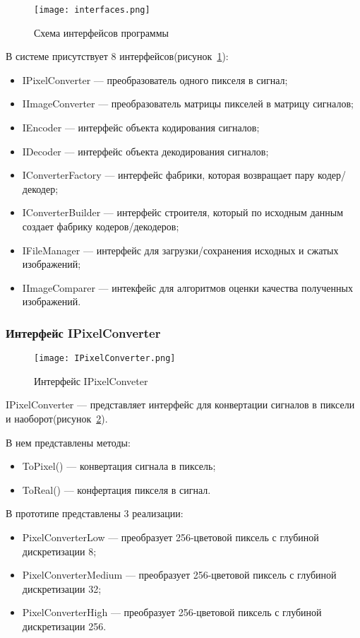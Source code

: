 \begin{figure}[ht]
\centering
  \texttt{[image: interfaces.png]}
  \caption{ Схема интерфейсов программы }
  \label{fig:interfaces}
\end{figure}
В системе присутствует 8 интерфейсов(рисунок~\ref{fig:interfaces}):
\begin{itemize}
  \item IPixelConverter --- преобразователь одного пикселя в сигнал;
  \item IImageConverter --- преобразователь матрицы пикселей в матрицу сигналов;
  \item IEncoder --- интерфейс объекта кодирования сигналов;
  \item IDecoder --- интерфейс объекта декодирования сигналов;
  \item IConverterFactory --- интерфейс фабрики, которая возвращает пару кодер/декодер;
  \item IConverterBuilder --- интерфейс строителя, который по исходным данным создает фабрику кодеров/декодеров;
  \item IFileManager --- интерфейс для загрузки/сохранения исходных и сжатых изображений;
  \item IImageComparer --- интекфейс для алгоритмов оценки качества полученных изображений.
\end{itemize}

\subsubsection{Интерфейс IPixelConverter}
\label{subsub:development:types:ipixelconverter}

\begin{figure}[ht]
\centering
  \texttt{[image: IPixelConverter.png]}
  \caption{ Интерфейс IPixelConveter }
  \label{fig:ipixelconverter}
\end{figure}
IPixelConverter --- представляет интерфейс для конвертации сигналов в пиксели и наоборот(рисунок~\ref{fig:ipixelconverter}).

В нем представлены методы:
\begin{itemize}
  \item ToPixel() --- конвертация сигнала в пиксель;
  \item ToReal() --- конфертация пикселя в сигнал.
\end{itemize}

В прототипе представлены 3 реализации:
\begin{itemize}
  \item PixelConverterLow --- преобразует 256-цветовой пиксель с глубиной дискретизации 8;
  \item PixelConverterMedium --- преобразует 256-цветовой пиксель с глубиной дискретизации 32;
  \item PixelConverterHigh --- преобразует 256-цветовой пиксель с глубиной дискретизации 256.
\end{itemize}

